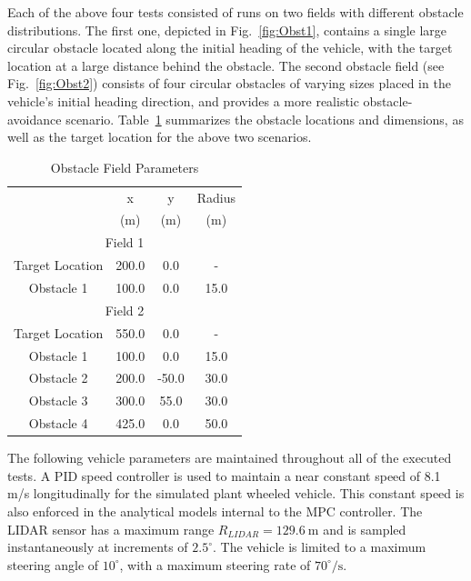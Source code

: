 \documentclass[12pt,onecolumn]{report}
\newcommand{\CHRONO}{{\sffamily{{Chrono}}}}
\begin{document}
Each of the above four tests consisted of runs on two fields with different obstacle distributions. 
The first one, depicted in Fig.~\ref{fig:Obst1}, contains a single large circular obstacle located along the initial heading of the vehicle, with the target location at a large distance behind the obstacle. 
The second obstacle field (see Fig.~\ref{fig:Obst2}) consists of four circular obstacles of varying sizes placed in the vehicle's initial heading direction, and provides a more realistic obstacle-avoidance scenario.
Table~\ref{t:ObstSummary} summarizes the obstacle locations and dimensions, as well as the target location for the above two scenarios.

\begin{table}
	\begin{center}
		\begin{tabular}{||c|c|c|c||} 
			
			\hline
			& x & y & Radius\\
			& (m) & (m) & (m)\\
			\hline\hline
			\multicolumn{4}{||c||}{Field 1} \\
			\hline
			Target Location  & 200.0 & 0.0 & -\\ 
			\hline
			Obstacle 1 & 100.0 & 0.0 & 15.0\\			
			\hline\hline
			\multicolumn{4}{||c||}{Field 2} \\
			\hline
			Target Location  & 550.0 & 0.0 & -\\ 
			\hline
			Obstacle 1 & 100.0 & 0.0 & 15.0\\
			\hline
			Obstacle 2 & 200.0 & -50.0 & 30.0\\
			\hline
			Obstacle 3 & 300.0 & 55.0 & 30.0\\
			\hline
			Obstacle 4 & 425.0 & 0.0 & 50.0\\
			\hline
		\end{tabular}
	\end{center}
	\caption{Obstacle Field Parameters}
	\label{t:ObstSummary}
\end{table}

The following vehicle parameters are maintained throughout all of the executed tests. A PID speed controller is used to maintain a near constant speed of 8.1 m/s longitudinally for the simulated plant {\CHRONO} wheeled vehicle. This constant speed is also enforced in the analytical models internal to the MPC controller. The LIDAR sensor has a maximum range $R_{LIDAR} = 129.6~\text{m}$ and is sampled instantaneously at increments of $2.5^\circ$. The vehicle is limited to a maximum steering angle of $10^\circ$, with a maximum steering rate of $70^{\circ}/\text{s}$. 
\end{document}
